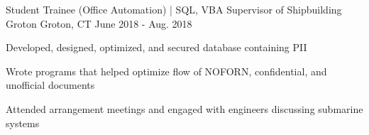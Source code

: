 \begin{cventries}
    \cventry
    {Student Trainee (Office Automation) | SQL, VBA} %
    {Supervisor of Shipbuilding Groton} %
    {Groton, CT} %
    {June 2018 - Aug. 2018} %
    {
      \begin{cvitems} %
        \item {Developed, designed, optimized, and secured database containing PII}
        \item {Wrote programs that helped optimize flow of NOFORN, confidential, and unofficial documents}
        \item {Attended arrangement meetings and engaged with engineers discussing submarine systems}
      \end{cvitems}
    }
\end{cventries}

